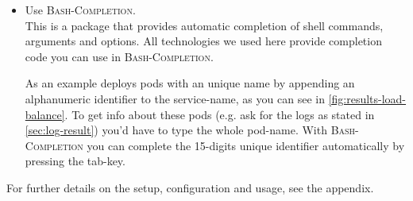 \begin{itemize}
	\item Use \textsc{Bash-Completion}.\\
	This is a package that provides automatic completion of shell commands, arguments and options.
	All technologies we used here provide completion code you can use in \textsc{Bash-Completion}.
	
	As an example \kubernetes{} deploys pods with an unique name by appending an alphanumeric identifier to the service-name, as you can see in \autoref{fig:results-load-balance}.
	To get info about these pods (e.g. ask for the logs as stated in \autoref{sec:log-result}) you'd have to type the whole pod-name.
	With \textsc{Bash-Completion} you can complete the 15-digits unique identifier automatically by pressing the tab-key.
	
\end{itemize}

For further details on the setup, configuration and usage, see the appendix.


